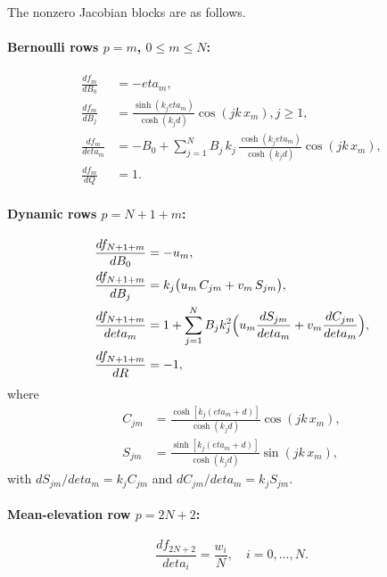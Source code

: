 \documentclass[journal,10pt,twocolumn]{IEEEtran}
\def\eta{eta}%
\def\partial{d}%
\def\;{ }%
\begin{document}
The nonzero Jacobian blocks are as follows.

\paragraph{Bernoulli rows $p=m$, $0\le m\le N$:}
\begin{align}
    \frac{\partial f_m}{\partial B_0}   &= -\eta_m,\\
    \frac{\partial f_m}{\partial B_j}   &= \frac{\sinh(k_j\eta_m)}{\cosh(k_j d)}\cos(jk\,x_m),\;j\ge1,\\
    \frac{\partial f_m}{\partial \eta_m}&= -B_0 +
    \sum_{j=1}^N B_j\,k_j\,\frac{\cosh(k_j\eta_m)}{\cosh(k_j d)}\cos(jk\,x_m),\\
    \frac{\partial f_m}{\partial Q}     &= 1.
\end{align}

\paragraph{Dynamic rows $p=N+1+m$:}
\begin{align}
    \frac{\partial f_{N+1+m}}{\partial B_0}
    &= -u_m,\\
    \frac{\partial f_{N+1+m}}{\partial B_j}
    &= k_j\bigl(u_m\,C_{jm} + v_m\,S_{jm}\bigr),\\
    \frac{\partial f_{N+1+m}}{\partial \eta_m}
    &= 1 + \sum_{j=1}^N B_j k_j^2
    \Bigl(u_m\frac{\partial S_{jm}}{\partial\eta_m}
    +v_m\frac{\partial C_{jm}}{\partial\eta_m}\Bigr),\\
    \frac{\partial f_{N+1+m}}{\partial R}
    &= -1,
\end{align}
where
\begin{equation}
\begin{aligned}
    C_{jm} &= \frac{\cosh[k_j(\eta_m+d)]}{\cosh(k_j d)}\cos(jk\,x_m),\\
    S_{jm} &= \frac{\sinh[k_j(\eta_m+d)]}{\cosh(k_j d)}\sin(jk\,x_m),
\end{aligned}
\end{equation}
with $\partial S_{jm}/\partial\eta_m = k_j C_{jm}$ and
$\partial C_{jm}/\partial\eta_m = k_j S_{jm}$.

\paragraph{Mean-elevation row $p=2N+2$:}
\[
    \frac{\partial f_{2N+2}}{\partial\eta_i} = \frac{w_i}{N},
    \quad i=0,\dots,N.
\]
\end{document}
